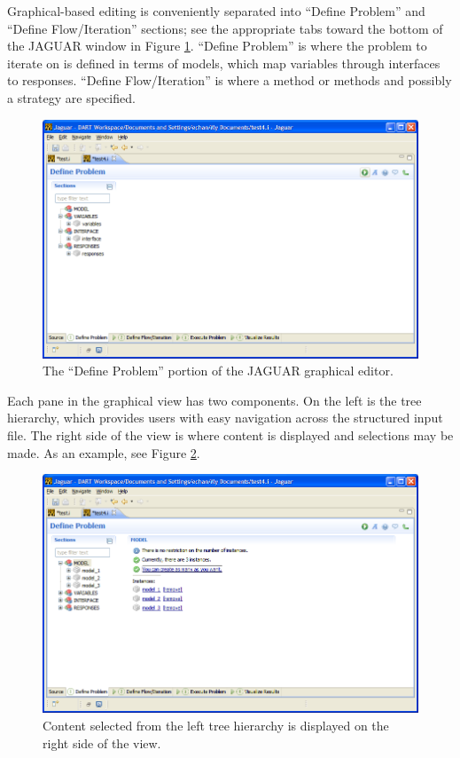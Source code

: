 Graphical-based editing is conveniently separated into ``Define
Problem'' and ``Define Flow/Iteration'' sections; see the appropriate
tabs toward the bottom of the JAGUAR window in Figure
\ref{fig:input:jag_graphical1}.  ``Define Problem'' is where the
problem to iterate on is defined in terms of models, which map
variables through interfaces to responses.  ``Define Flow/Iteration''
is where a method or methods and possibly a strategy are specified.
\begin{figure}
  \centering
  \includegraphics[scale=0.4]{images/jag_graphical1}
  \caption{The ``Define Problem'' portion of the JAGUAR graphical
    editor.}
  \label{fig:input:jag_graphical1}
\end{figure}

Each pane in the graphical view has two components.  On the left is
the tree hierarchy, which provides users with easy navigation across
the structured input file.  The right side of the view is where
content is displayed and selections may be made.  As an example, see
Figure \ref{fig:input:jag_graphical2}.
\begin{figure}
  \centering
  \includegraphics[scale=0.4]{images/jag_graphical2}
  \caption{Content selected from the left tree hierarchy is displayed
    on the right side of the view.}
  \label{fig:input:jag_graphical2}
\end{figure}

